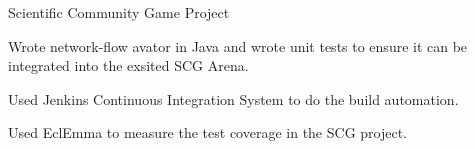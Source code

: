 \begin{cventries}
\cventry
{Scientific Community Game Project} %
{} %
{} %
{} %
{ %
\begin{cvitems}
\item {Wrote network-flow avator in Java and wrote unit tests to ensure it can be integrated into the exsited SCG Arena.}
\item {Used Jenkins Continuous Integration System to do the build automation.}
\item {Used EclEmma to measure the test coverage in the SCG project.}
\end{cvitems}
}


\end{cventries}